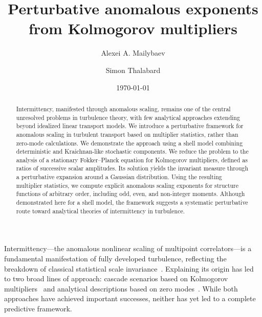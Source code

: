 \documentclass[aps,twocolumn,superscriptaddress]{revtex4-2}
\begin{document}
\title{Perturbative anomalous exponents from Kolmogorov multipliers}
\author{Alexei A. Mailybaev}
\author{Simon Thalabard}
\begin{abstract}
Intermittency, manifested through anomalous scaling, remains one of the central unresolved problems in turbulence theory, with few analytical approaches extending beyond idealized linear transport models. We introduce a perturbative framework for anomalous scaling in turbulent transport based on multiplier statistics, rather than zero-mode calculations. We demonstrate the approach using a shell model combining deterministic and Kraichnan-like stochastic components. We reduce the problem to the analysis of a stationary Fokker--Planck equation for Kolmogorov multipliers, defined as ratios of successive scalar amplitudes. Its solution yields the invariant measure through a perturbative expansion around a Gaussian distribution. Using the resulting multiplier statistics, we compute explicit anomalous scaling exponents for structure functions of arbitrary order, including odd, even, and non-integer moments. Although demonstrated here for a shell model, the framework suggests a systematic perturbative route toward analytical theories of intermittency in turbulence.
\end{abstract}

\date{\today}
\maketitle

Intermittency---the anomalous nonlinear scaling of multipoint correlators---is a fundamental manifestation of fully developed turbulence, reflecting the breakdown of classical statistical scale invariance~\cite{frisch1995turbulence}. Explaining its origin has led to two broad lines of approach: cascade scenarios based on Kolmogorov multipliers~\cite{kolmogorov1962refinement,benzi1993intermittency,eyink2003gibbsian} and analytical descriptions based on zero modes~\cite{bernard1998slow,falkovich2001particles,benzi2023lectures}.
While both approaches have achieved important successes, neither has yet led to a complete predictive framework.
\end{document}
